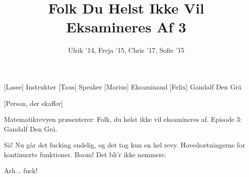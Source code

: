 \documentclass[a4paper,11pt]{article}
\title{Folk Du Helst Ikke Vil Eksamineres Af 3}
\author{Ulrik '14, Freja '15, Chris '17, Sofie '15}
\begin{document}
\maketitle

\begin{roles}
[Lasse] Instruktør
[Taus] Speaker
[Marius] Eksaminand
[Felix] Gandalf Den Grå
\end{roles}

\begin{props}
[Person, der skaffer]
\end{props}

\begin{sketch}
 Matematikrevyen præsenterer: Folk, du helst ikke vil eksamineres af. Episode 3: Gandalf Den Grå.



 Så! Nu går det fucking endelig, og det tog kun en hel revy. Hovedsætningerne for kontinuerte funktioner. Boom! Det bli'r ikke nemmere.


 Arh... fuck!

\end{sketch}
\end{document}
